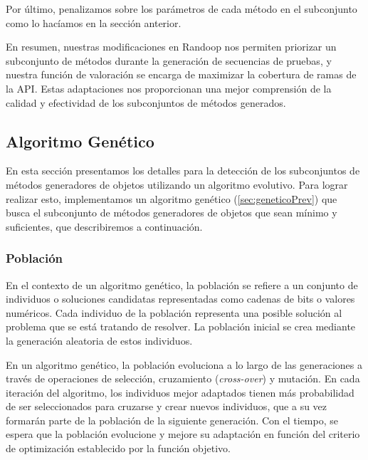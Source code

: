 Por último, penalizamos sobre los parámetros de cada método en el subconjunto como lo hacíamos en la sección anterior.

En resumen, nuestras modificaciones en Randoop nos permiten priorizar un subconjunto de métodos durante la generación de secuencias de pruebas, y nuestra función de valoración se encarga de maximizar la cobertura de ramas de la API. Estas adaptaciones nos proporcionan una mejor comprensión de la calidad y efectividad de los subconjuntos de métodos generados.



\subsection{Algoritmo Genético}
\label{alg:approachGA}

En esta sección presentamos los detalles para la detección de los subconjuntos de métodos generadores de objetos utilizando un algoritmo evolutivo. Para lograr realizar esto, implementamos un algoritmo genético (\ref{sec:geneticoPrev}) que busca el subconjunto de métodos generadores de objetos que sean mínimo y suficientes, que describiremos a continuación.








\subsubsection{Población}

En el contexto de un algoritmo genético, la población se refiere a un conjunto de individuos o soluciones candidatas representadas como cadenas de bits o valores numéricos. Cada individuo de la población representa una posible solución al problema que se está tratando de resolver. La población inicial se crea mediante la generación aleatoria de estos individuos.

En un algoritmo genético, la población evoluciona a lo largo de las generaciones a través de operaciones de selección, cruzamiento (\emph{cross-over}) y mutación. En cada iteración del algoritmo, los individuos mejor adaptados tienen más probabilidad de ser seleccionados para cruzarse y crear nuevos individuos, que a su vez formarán parte de la población de la siguiente generación. Con el tiempo, se espera que la población evolucione y mejore su adaptación en función del criterio de optimización establecido por la función objetivo.

